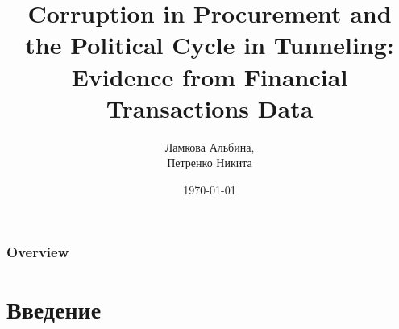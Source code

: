 \documentclass{beamer}
\title[Corruption in Procurement]{Corruption in Procurement and the Political Cycle in Tunneling: Evidence from Financial Transactions Data}
\author{Ламкова Альбина,\\ Петренко Никита}
\date{\today}
\begin{document}
\begin{frame}
\titlepage
\end{frame}

\begin{frame}
\frametitle{Overview} %
\tableofcontents
\end{frame}



\section{Введение} 




\end{document}
